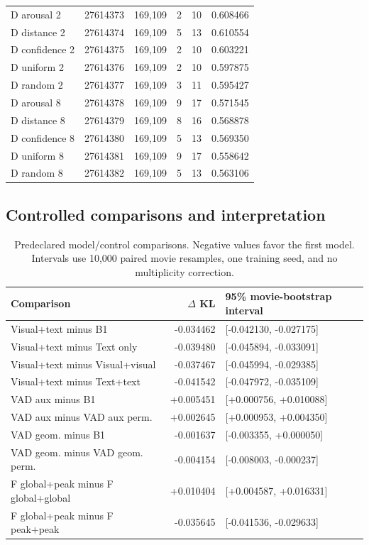 \begin{longtable}{lrrrrr}
D arousal 2 & 27614373 & 169,109 & 2 & 10 & 0.608466\\
D distance 2 & 27614374 & 169,109 & 5 & 13 & 0.610554\\
D confidence 2 & 27614375 & 169,109 & 2 & 10 & 0.603221\\
D uniform 2 & 27614376 & 169,109 & 2 & 10 & 0.597875\\
D random 2 & 27614377 & 169,109 & 3 & 11 & 0.595427\\
D arousal 8 & 27614378 & 169,109 & 9 & 17 & 0.571545\\
D distance 8 & 27614379 & 169,109 & 8 & 16 & 0.568878\\
D confidence 8 & 27614380 & 169,109 & 5 & 13 & 0.569350\\
D uniform 8 & 27614381 & 169,109 & 9 & 17 & 0.558642\\
D random 8 & 27614382 & 169,109 & 5 & 13 & 0.563106\\
\bottomrule\end{longtable}\endgroup

\subsection{Controlled comparisons and interpretation}
\begingroup\footnotesize\setlength{\tabcolsep}{4pt}
\begin{longtable}{lrl}
\caption{Predeclared model/control comparisons. Negative values favor the first model. Intervals use 10,000 paired movie resamples, one training seed, and no multiplicity correction.}\\
\toprule
Comparison & $\Delta$ KL & 95\% movie-bootstrap interval\\\midrule\endhead
Visual+text minus B1 & -0.034462 & [-0.042130, -0.027175]\\
Visual+text minus Text only & -0.039480 & [-0.045894, -0.033091]\\
Visual+text minus Visual+visual & -0.037467 & [-0.045994, -0.029385]\\
Visual+text minus Text+text & -0.041542 & [-0.047972, -0.035109]\\
VAD aux minus B1 & +0.005451 & [+0.000756, +0.010088]\\
VAD aux minus VAD aux perm. & +0.002645 & [+0.000953, +0.004350]\\
VAD geom. minus B1 & -0.001637 & [-0.003355, +0.000050]\\
VAD geom. minus VAD geom. perm. & -0.004154 & [-0.008003, -0.000237]\\
F global+peak minus F global+global & +0.010404 & [+0.004587, +0.016331]\\
F global+peak minus F peak+peak & -0.035645 & [-0.041536, -0.029633]\\
\bottomrule\end{longtable}\endgroup

